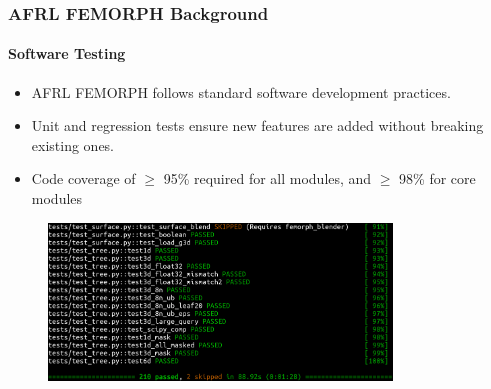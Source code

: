 \documentclass[t]{beamer}
\begin{document}

\begin{frame}
  \frametitle{AFRL FEMORPH Background}
  \framesubtitle{Software Testing}

  \begin{itemize}
  \item AFRL FEMORPH follows standard software development practices.
  \item Unit and regression tests ensure new features are added without breaking existing ones.
  \item Code coverage of $\geq$ 95\% required for all modules, and $\geq$ 98\% for core modules
  \end{itemize}

      \begin{figure}
       \includegraphics[height=1.65in]{./figures/pytest.png}
      \end{figure}

\end{frame}


\end{document}
